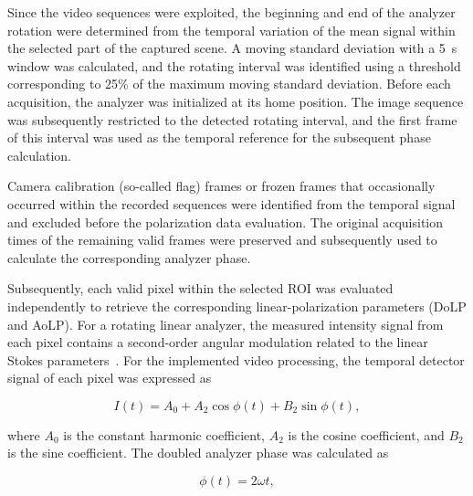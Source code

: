 \documentclass[pdflatex,sn-apa]{sn-jnl}
\begin{document}
Since the video sequences were exploited, the beginning and end of the analyzer rotation were determined from the temporal variation of the mean signal within the selected part of the captured scene. A moving standard deviation with a 5~s window was calculated, and the rotating interval was identified using a threshold corresponding to 25\% of the maximum moving standard deviation. Before each acquisition, the analyzer was initialized at its home position. The image sequence was subsequently restricted to the detected rotating interval, and the first frame of this interval was used as the temporal reference for the subsequent phase calculation.


Camera calibration (so-called flag) frames or frozen frames that occasionally occurred within the recorded sequences were identified from the temporal signal and excluded before the polarization data evaluation. The original acquisition times of the remaining valid frames were preserved and subsequently used to calculate the corresponding analyzer phase.

Subsequently, each valid pixel within the selected ROI was evaluated independently to retrieve the corresponding linear-polarization parameters (DoLP and AoLP). For a rotating linear analyzer, the measured intensity signal from each pixel contains a second-order angular modulation related to the linear Stokes parameters~\citep{Chipman2018}. For the implemented video processing, the temporal detector signal of each pixel was expressed as

\begin{equation}
 I(t)=A_0+A_2\cos\phi(t)+B_2\sin\phi(t),
 \label{eq:intensity_model}
\end{equation}

\noindent
where $A_0$ is the constant harmonic coefficient, $A_2$ is the cosine coefficient, and $B_2$ is the sine coefficient. The doubled analyzer phase was calculated as

\begin{equation}
 \phi(t)=2\omega t,
 \label{eq:phase}
\end{equation}
\end{document}
